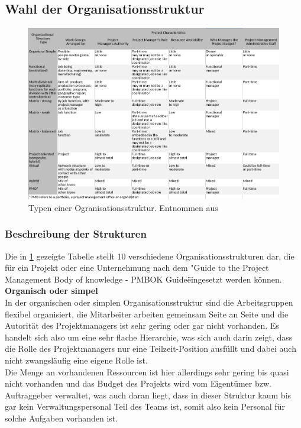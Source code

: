 \documentclass[ThesisDJ.tex]{subfiles}
\begin{document}
  \subsection{Wahl der Organisationsstruktur}

\begin{figure}[ht]
    \hspace{-0.5cm}
    \includegraphics[width=40pc]{./Organisationsstrukturen.png}
    \caption{Typen einer Ogranisationsstruktur. Entnommen aus\cite[S.~75]{PMI2017PMBOK}}
    \label{fig:orgstrukturen}
\end{figure} 

\subsubsection{Beschreibung der Strukturen}

Die in \ref{fig:orgstrukturen} gezeigte Tabelle stellt 10 verschiedene Organisationsstrukturen dar, die für ein Projekt oder eine Unternehmung nach dem "Guide to the Project Management Body of knowledge - PMBOK Guide\" eingesetzt werden können.\cite{PMI2017PMBOK} \smallskip\\

\textbf{Organisch oder simpel}\\
In der organischen oder simplen Organisationsstruktur sind die Arbeitsgruppen flexibel organisiert, die Mitarbeiter arbeiten gemeinsam Seite an Seite und die Autorität des Projektmanagers ist sehr gering oder gar nicht vorhanden. Es handelt sich also um eine sehr flache Hierarchie, was sich auch darin zeigt, dass die Rolle des Projektmanagers nur eine Teilzeit-Position ausfüllt und dabei auch nicht zwangsläufig eine eigene Rolle ist.\\
Die Menge an vorhandenen Ressourcen ist hier allerdings sehr gering bis quasi nicht vorhanden und das Budget des Projekts wird vom Eigentümer bzw. Auftraggeber verwaltet, was auch daran liegt, dass in dieser Struktur kaum bis gar kein Verwaltungspersonal Teil des Teams ist, somit also kein Personal für solche Aufgaben vorhanden ist. \medskip\\
\end{document}
